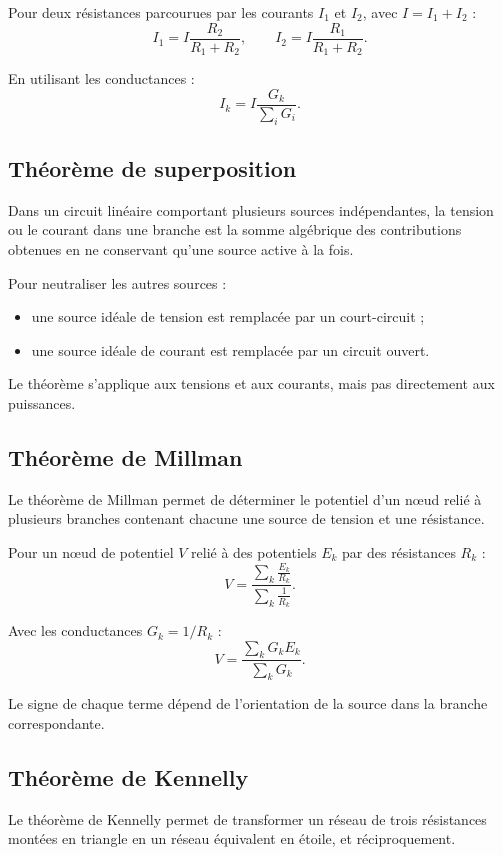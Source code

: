 Pour deux résistances parcourues par les courants $I_1$ et $I_2$, avec $I=I_1+I_2$ :
\[
I_1=I\frac{R_2}{R_1+R_2},
\qquad
I_2=I\frac{R_1}{R_1+R_2}.
\]

En utilisant les conductances :
\[
I_k=I\frac{G_k}{\sum_i G_i}.
\]

\subsection{Théorème de superposition}

Dans un circuit linéaire comportant plusieurs sources indépendantes, la tension ou le courant dans une branche est la somme algébrique des contributions obtenues en ne conservant qu'une source active à la fois.

Pour neutraliser les autres sources :
\begin{itemize}
  \item une source idéale de tension est remplacée par un court-circuit ;
  \item une source idéale de courant est remplacée par un circuit ouvert.
\end{itemize}

Le théorème s'applique aux tensions et aux courants, mais pas directement aux puissances.

\subsection{Théorème de Millman}

Le théorème de Millman permet de déterminer le potentiel d'un nœud relié à plusieurs branches contenant chacune une source de tension et une résistance.

Pour un nœud de potentiel $V$ relié à des potentiels $E_k$ par des résistances $R_k$ :
\[
V=\frac{\displaystyle\sum_k \frac{E_k}{R_k}}
        {\displaystyle\sum_k \frac{1}{R_k}}.
\]

Avec les conductances $G_k=1/R_k$ :
\[
V=\frac{\sum_k G_kE_k}{\sum_k G_k}.
\]

Le signe de chaque terme dépend de l'orientation de la source dans la branche correspondante.

\subsection{Théorème de Kennelly}

Le théorème de Kennelly permet de transformer un réseau de trois résistances montées en triangle en un réseau équivalent en étoile, et réciproquement.

